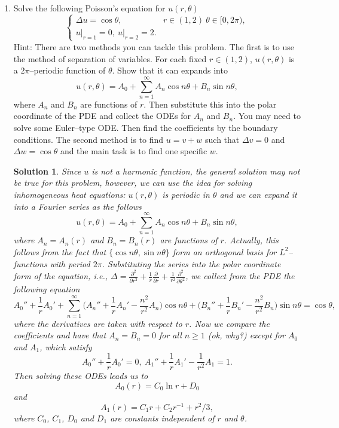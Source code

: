 \documentclass[6pt]{article}
\newtheorem{solution}{Solution}
\numberwithin{equation}{section}
\begin{document}
\begin{enumerate}
\item Solve the following Poisson's equation for $u(r,\theta)$
\begin{equation}
\left\{
\begin{array}{ll}
\Delta u=\cos \theta,&r\in(1,2)~\theta\in[0,2\pi), \\
u\vert_{r=1}=0,~ u\vert_{r=2}=2.
\end{array}
\right.
\end{equation}
Hint: There are two methods you can tackle this problem.  The first is to use the method of separation of variables.  For each fixed $r\in(1,2)$, $u(r,\theta)$ is a $2\pi$--periodic function of $\theta$.  Show that it can expands into
\[u(r,\theta)=A_0+\sum_{n=1}^\infty A_n \cos n\theta+B_n\sin n \theta,  \]
where $A_n$ and $B_n$ are functions of $r$.  Then substitute this into the polar coordinate of the PDE and collect the ODEs for $A_n$ and $B_n$.  You may need to solve some Euler--type ODE.  Then find the coefficients by the boundary conditions.  The second method is to find $u=v+w$ such that $\Delta v=0$ and $\Delta w=\cos \theta$ and the main task is to find one specific $w$.
\begin{solution}
Since $u$ is not a harmonic function, the general solution may not be true for this problem,  however, we can use the idea for solving inhomogeneous heat equations: $u(r,\theta)$ is periodic in $\theta$ and we can expand it into a Fourier series as the follows
\[u(r,\theta)=A_0+\sum_{n=1}^\infty A_n\cos n \theta +B_n \sin n \theta,\]
where $A_n=A_n(r)$ and $B_n=B_n(r)$ are functions of $r$.  Actually, this follows from the fact that $\{\cos n \theta, \sin n \theta\}$ form an orthogonal basis for $L^2$--functions with period $2\pi$.  Substituting the series into the polar coordinate form of the equation, i.e., $\Delta =\frac{\partial^2 }{\partial r^2}+\frac{1}{r}\frac{\partial  }{\partial r }+\frac{1}{r^2}\frac{\partial^2 }{\partial \theta^2}$, we collect from the PDE the following equation
\[A_0''+\frac{1}{r}A_0'+\sum_{n=1}^\infty \big(A_n''+\frac{1}{r}A_n'-\frac{n^2}{r^2}A_n \big)\cos n \theta+\big(B_n''+\frac{1}{r}B_n'-\frac{n^2}{r^2}B_n \big)\sin n \theta=\cos \theta,\]
where the derivatives are taken with respect to $r$.  Now we compare the coefficients and have that $A_n=B_n=0$ for all $n\geq1$ (ok, why?) except for $A_0$ and $A_1$, which satisfy
\[A_0''+\frac{1}{r}A_0'=0,~A_1''+\frac{1}{r}A_1'-\frac{1}{r^2}A_1=1.\]
Then solving these ODEs leads us to
\[A_0(r)=C_0\ln r+D_0\]
and
\[A_1(r)=C_1r+C_2r^{-1}+r^2/3,\]
where $C_0$, $C_1$, $D_0$ and $D_1$ are constants independent of $r$ and $\theta$.


\end{solution}
\end{enumerate}
\end{document}
